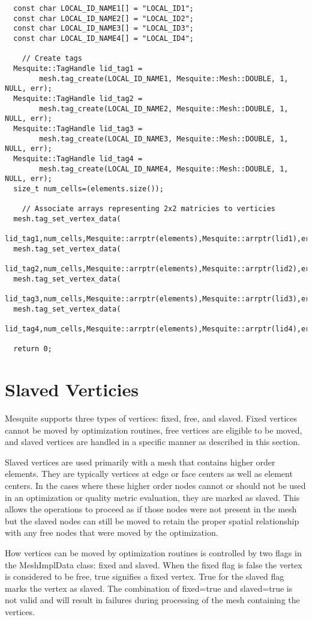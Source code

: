 \begin{lstlisting}
  const char LOCAL_ID_NAME1[] = "LOCAL_ID1";
  const char LOCAL_ID_NAME2[] = "LOCAL_ID2";
  const char LOCAL_ID_NAME3[] = "LOCAL_ID3";
  const char LOCAL_ID_NAME4[] = "LOCAL_ID4";

    // Create tags
  Mesquite::TagHandle lid_tag1 =
        mesh.tag_create(LOCAL_ID_NAME1, Mesquite::Mesh::DOUBLE, 1, NULL, err);
  Mesquite::TagHandle lid_tag2 =
        mesh.tag_create(LOCAL_ID_NAME2, Mesquite::Mesh::DOUBLE, 1, NULL, err);
  Mesquite::TagHandle lid_tag3 =
        mesh.tag_create(LOCAL_ID_NAME3, Mesquite::Mesh::DOUBLE, 1, NULL, err);
  Mesquite::TagHandle lid_tag4 =
        mesh.tag_create(LOCAL_ID_NAME4, Mesquite::Mesh::DOUBLE, 1, NULL, err);
  size_t num_cells=(elements.size());

    // Associate arrays representing 2x2 matricies to verticies
  mesh.tag_set_vertex_data(
      lid_tag1,num_cells,Mesquite::arrptr(elements),Mesquite::arrptr(lid1),err);
  mesh.tag_set_vertex_data(
      lid_tag2,num_cells,Mesquite::arrptr(elements),Mesquite::arrptr(lid2),err);
  mesh.tag_set_vertex_data(
      lid_tag3,num_cells,Mesquite::arrptr(elements),Mesquite::arrptr(lid3),err);
  mesh.tag_set_vertex_data(
      lid_tag4,num_cells,Mesquite::arrptr(elements),Mesquite::arrptr(lid4),err);

  return 0;
\end{lstlisting}

\section{Slaved Verticies} \label{sec:slaved_vertices}

Mesquite supports three types of vertices: fixed, free, and slaved.  Fixed vertices cannot be moved by optimization routines, free vertices are eligible to be moved, and slaved vertices are handled in a specific manner as described in this section.

Slaved vertices are used primarily with a mesh that contains higher order elements.  They are typically vertices at edge or face centers as well as element centers.  In the cases where these higher order nodes cannot or should not be used in an optimization or quality metric evaluation, they are marked as slaved.  This allows the operations to proceed as if those nodes were not present in the mesh but the slaved nodes can still be moved to retain the proper spatial relationship with any free nodes that were moved by the optimization.

How vertices can be moved by optimization routines is controlled by two flags in the MeshImplData class: fixed and slaved.  When the fixed flag is false the vertex is considered to be free, true signifies a fixed vertex.  True for the slaved flag marks the vertex as slaved.  The combination of fixed=true and slaved=true is not valid and will result in failures during processing of the mesh containing the vertices.


